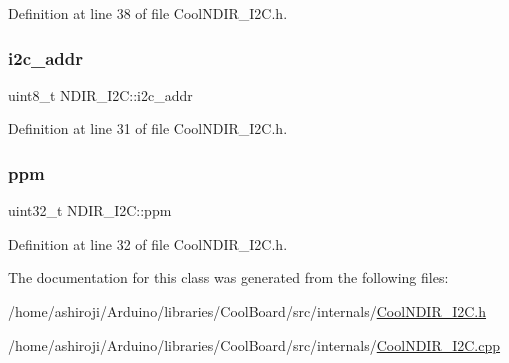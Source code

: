 Definition at line 38 of file Cool\+N\+D\+I\+R\+\_\+\+I2\+C.\+h.

\mbox{\label{class_n_d_i_r___i2_c_aac12069dd5a86a9ec6aa31ac9a44aabe}} 
\subsubsection{\texorpdfstring{i2c\+\_\+addr}{i2c\_addr}}
{\footnotesize\ttfamily uint8\+\_\+t N\+D\+I\+R\+\_\+\+I2\+C\+::i2c\+\_\+addr}



Definition at line 31 of file Cool\+N\+D\+I\+R\+\_\+\+I2\+C.\+h.

\mbox{\label{class_n_d_i_r___i2_c_a7e5cfc725dba0f9c2bd1bd5ab3bb8600}} 
\subsubsection{\texorpdfstring{ppm}{ppm}}
{\footnotesize\ttfamily uint32\+\_\+t N\+D\+I\+R\+\_\+\+I2\+C\+::ppm}



Definition at line 32 of file Cool\+N\+D\+I\+R\+\_\+\+I2\+C.\+h.



The documentation for this class was generated from the following files\+:\begin{DoxyCompactItemize}
\item 
/home/ashiroji/\+Arduino/libraries/\+Cool\+Board/src/internals/\hyperlink{_cool_n_d_i_r___i2_c_8h}{Cool\+N\+D\+I\+R\+\_\+\+I2\+C.\+h}\item 
/home/ashiroji/\+Arduino/libraries/\+Cool\+Board/src/internals/\hyperlink{_cool_n_d_i_r___i2_c_8cpp}{Cool\+N\+D\+I\+R\+\_\+\+I2\+C.\+cpp}\end{DoxyCompactItemize}
